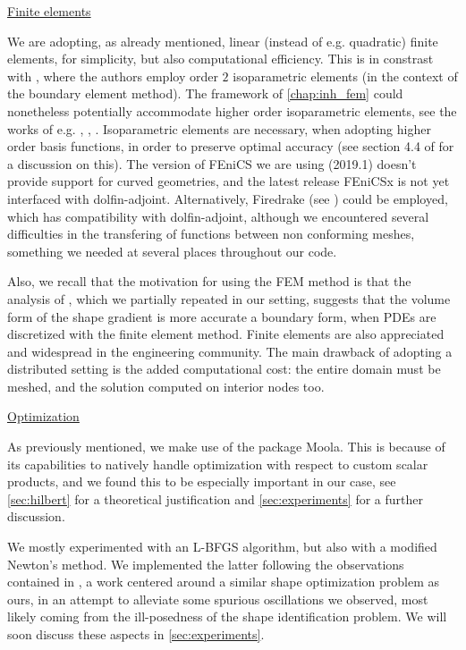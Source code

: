 \documentclass[english,a4paper,9pt,oneside]{scrbook}	%
\theoremstyle{break}
\theoremstyle{remark}
\begin{document}
\underline{Finite elements}

We are adopting, as already mentioned, linear (instead of e.g. quadratic) finite elements, for simplicity, but also computational efficiency. This is in constrast with \cite{harbrecht}, where the authors employ order $2$ isoparametric elements (in the context of the boundary element method). The framework of \cref{chap:inh_fem} could nonetheless potentially accommodate higher order isoparametric elements, see the works of e.g. \cite{edelmann}, \cite{elliott}, \cite{ranner}. Isoparametric elements are necessary, when adopting higher order basis functions, in order to preserve optimal accuracy (see section 4.4 of \cite{strang} for a discussion on this). The version of FEniCS we are using (2019.1) doesn't provide support for curved geometries, and the latest release FEniCSx is not yet interfaced with dolfin-adjoint. Alternatively, Firedrake (see \cite{firedrake}) could be employed, which has compatibility with dolfin-adjoint, although we encountered several difficulties in the transfering of functions between non conforming meshes, something we needed at several places throughout our code.

Also, we recall that the motivation for using the FEM method is that the analysis of \cite{paganini}, which we partially repeated in our setting, suggests that the volume form of the shape gradient is more accurate a boundary form, when PDEs are discretized with the finite element method. Finite elements are also appreciated and widespread in the engineering community.
The main drawback of adopting a distributed setting is the added computational cost: the entire domain must be meshed, and the solution computed on interior nodes too.

\underline{Optimization}

As previously mentioned, we make use of the package Moola. This is because of its capabilities to natively handle optimization with respect to custom scalar products, and we found this to be especially important in our case, see \cref{sec:hilbert} for a theoretical justification and \cref{sec:experiments} for a further discussion.

We mostly experimented with an L-BFGS algorithm, but also with a modified Newton's method. We implemented the latter following the observations contained in \cite{eppler}, a work centered around a similar shape optimization problem as ours, in an attempt to alleviate some spurious oscillations we observed, most likely coming from the ill-posedness of the shape identification problem. We will soon discuss these aspects in \cref{sec:experiments}.
\end{document}
